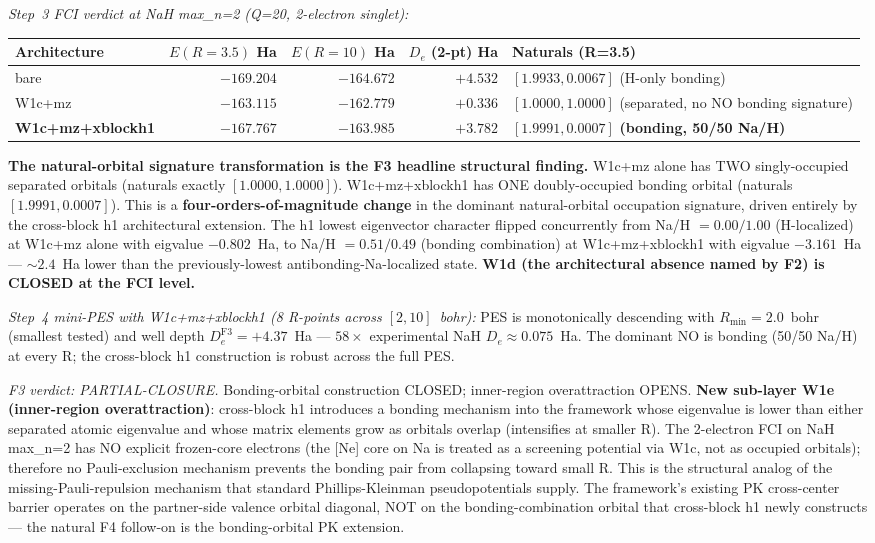 \documentclass[aps,pra,twocolumn,superscriptaddress,longbibliography]{revtex4-2}
\begin{document}
\emph{Step~3 FCI verdict at NaH max\_n=2 (Q=20, 2-electron singlet):}

\begin{center}
\begin{tabular}{lrrrl}
\hline
Architecture & $E(R=3.5)$ Ha & $E(R=10)$ Ha & $D_e$ (2-pt) Ha & Naturals (R=3.5) \\
\hline
bare & $-169.204$ & $-164.672$ & $+4.532$ & $[1.9933, 0.0067]$ (H-only bonding) \\
W1c+mz & $-163.115$ & $-162.779$ & $+0.336$ & $[1.0000, 1.0000]$ (separated, no NO bonding signature) \\
\textbf{W1c+mz+xblockh1} & $\mathbf{-167.767}$ & $\mathbf{-163.985}$ & $\mathbf{+3.782}$ & $\mathbf{[1.9991, 0.0007]}$ \textbf{(bonding, 50/50 Na/H)} \\
\hline
\end{tabular}
\end{center}

\textbf{The natural-orbital signature transformation is the F3 headline
structural finding.} W1c+mz alone has TWO singly-occupied separated
orbitals (naturals exactly $[1.0000, 1.0000]$). W1c+mz+xblockh1 has ONE
doubly-occupied bonding orbital (naturals $[1.9991, 0.0007]$). This is a
\textbf{four-orders-of-magnitude change} in the dominant natural-orbital
occupation signature, driven entirely by the cross-block h1 architectural
extension. The h1 lowest eigenvector character flipped concurrently from
Na/H $= 0.00/1.00$ (H-localized) at W1c+mz alone with eigvalue $-0.802$~Ha,
to Na/H $= 0.51/0.49$ (bonding combination) at W1c+mz+xblockh1 with
eigvalue $-3.161$~Ha --- $\sim 2.4$~Ha lower than the previously-lowest
antibonding-Na-localized state. \textbf{W1d (the architectural absence
named by F2) is CLOSED at the FCI level.}

\emph{Step~4 mini-PES with W1c+mz+xblockh1 (8 R-points across $[2, 10]$~bohr):}
PES is monotonically descending with $R_\text{min} = 2.0$~bohr (smallest
tested) and well depth $D_e^\text{F3} = +4.37$~Ha --- $58\times$
experimental NaH $D_e \approx 0.075$~Ha. The dominant NO is bonding (50/50
Na/H) at every R; the cross-block h1 construction is robust across the
full PES.

\emph{F3 verdict: PARTIAL-CLOSURE.} Bonding-orbital construction CLOSED;
inner-region overattraction OPENS. \textbf{New sub-layer W1e (inner-region
overattraction)}: cross-block h1 introduces a bonding mechanism into the
framework whose eigenvalue is lower than either separated atomic eigenvalue
and whose matrix elements grow as orbitals overlap (intensifies at smaller
R). The 2-electron FCI on NaH max\_n=2 has NO explicit frozen-core
electrons (the [Ne] core on Na is treated as a screening potential via
W1c, not as occupied orbitals); therefore no Pauli-exclusion mechanism
prevents the bonding pair from collapsing toward small R. This is the
structural analog of the missing-Pauli-repulsion mechanism that standard
Phillips-Kleinman pseudopotentials supply. The framework's existing PK
cross-center barrier operates on the partner-side valence orbital diagonal,
NOT on the bonding-combination orbital that cross-block h1 newly
constructs --- the natural F4 follow-on is the bonding-orbital PK
extension.
\end{document}
